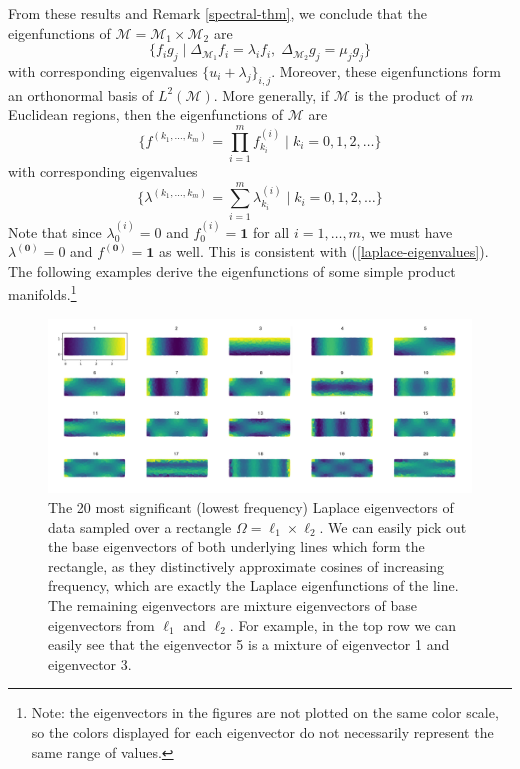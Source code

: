 \documentclass{article}
\numberwithin{equation}{section}
\theoremstyle{definition}
\begin{document}
From these results and Remark \ref{spectral-thm}, we conclude that the eigenfunctions of $\mathcal{M} = \mathcal{M}_1\times\mathcal{M}_2$ are
\begin{equation}
    \{f_ig_j \mid \Delta_{\mathcal{M}_1}f_i = \lambda_if_i, \; \Delta_{\mathcal{M}_2}g_j = \mu_jg_j \}
\end{equation}
with corresponding eigenvalues $\{u_i+\lambda_j\}_{i,j}$. Moreover, these eigenfunctions form an orthonormal basis of $L^2(\mathcal{M})$. More generally, if $\mathcal{M}$ is the product of $m$ Euclidean regions, then the eigenfunctions of $\mathcal{M}$ are
\begin{equation}
    \bigg\{f^{(k_1, \ldots, k_m)} = \prod_{i=1}^m f^{(i)}_{k_i} \; \bigg| \; k_i = 0, 1, 2, \ldots\bigg\}
\end{equation}
with corresponding eigenvalues
\begin{equation}
    \bigg\{\lambda^{(k_1, \ldots, k_m)} = \sum_{i=1}^m \lambda^{(i)}_{k_i} \; \bigg| \; k_i = 0, 1, 2, \ldots\bigg\}
\end{equation}
Note that since $\lambda^{(i)}_0 = 0$ and $f^{(i)}_0 = \mathbf{1}$ for all $i = 1, \ldots, m$, we must have $\lambda^{(\mathbf{0})} = 0$ and $f^{(\mathbf{0})} = \mathbf{1}$ as well. This is consistent with (\ref{laplace-eigenvalues}). The following examples derive the eigenfunctions of some simple product manifolds.\footnote{Note: the eigenvectors in the figures are not plotted on the same color scale, so the colors displayed for each eigenvector do not necessarily represent the same range of values.}

\begin{figure}[ht]
    \centering
    \includegraphics[width=\textwidth]{images/line_line_eigenvalues_20.png}
    \caption{The 20 most significant (lowest frequency) Laplace eigenvectors of data sampled over a rectangle $\Omega = \ell_1 \times \ell_2$. We can easily pick out the base eigenvectors of both underlying lines which form the rectangle, as they distinctively approximate cosines of increasing frequency, which are exactly the Laplace eigenfunctions of the line. The remaining eigenvectors are mixture eigenvectors of base eigenvectors from $\ell_1$ and $\ell_2$. For example, in the top row we can easily see that the eigenvector 5 is a mixture of eigenvector 1 and eigenvector 3.}
    \label{fig:rect_eigenvectors}
\end{figure}
\end{document}
